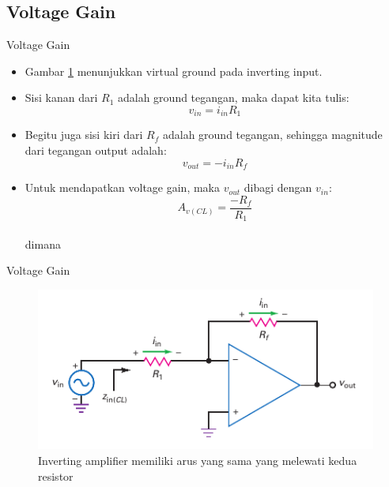 \subsection{Voltage Gain}
\begin{frame}{Voltage Gain}
	\begin{itemize}
		\item Gambar \ref{fig-16.14} menunjukkan virtual ground pada inverting input.
		\item Sisi kanan dari $ R_1 $ adalah ground tegangan, maka dapat kita tulis:\\
		$$ v_{in} = i_{in} R_1 $$
		\item Begitu juga sisi kiri dari $ R_f $ adalah ground tegangan, sehingga magnitude dari tegangan output adalah:\\
		$$ v_{out} = -i_{in} R_f $$
		\item Untuk mendapatkan voltage gain, maka $ v_{out} $ dibagi dengan $ v_{in} $:
		\begin{equation}\label{pers.16.3}
			A_{v(CL)} = \frac{-R_f}{R_1}
		\end{equation}\\
		dimana 
	\end{itemize}
\end{frame}

\begin{frame}{Voltage Gain}
	\begin{figure}
		\centering
		\includegraphics[height=0.7\textheight]{gambar/fig-16.14}
		\caption{Inverting amplifier memiliki arus yang sama yang melewati kedua resistor}
		\label{fig-16.14}
	\end{figure}
\end{frame}

